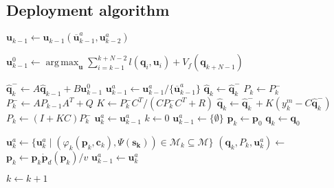\documentclass[letterpaper,10pt,conference]{ieeeconf}
\DeclarePairedDelimiter\abs{\lvert}{\rvert}%
\theoremstyle{definition}
\DeclareMathOperator*{\argmax}{arg\,max}
\begin{document}
\subsection{Deployment algorithm}

\begin{algorithmic}[1]
  \label{alg:step}
  
  \State $\mathbf{u}_{k-1}\gets {\mathbf{u}_{k-1}(\overline{\mathbf{u}}_{k-1}^a,\mathbf{u}_{k-2}^a)}$\label{alg:max_cont_sequence}

  \State $\mathbf{u}^0_{k-1}\gets\argmax_{\mathbf{u}}{\sum_{i=k-1}^{k+N-2}{l(\mathbf{q}_i,\mathbf{u}_i)+V_f(\mathbf{q}_{k+N-1})}}$\label{alg:mpc}

  \State $\hat{\mathbf{q}}_k^-\gets A\hat{\mathbf{q}}_{k-1} + B\mathbf{u}^0_{k-1}$
  \label{alg:output_constraints}
    \State $\mathbf{u}^a_{k-1}\gets\mathbf{u}^a_{k-1}/\{\overline{\mathbf{u}}^a_{k-1}\}$
    \State{}\label{alg:recursion}
  \Else
      \State $\hat{\mathbf{q}}_k\gets\hat{\mathbf{q}}_k^-$\label{alg:evolution}
      \State $P_k\gets P_k^-$
    \Else 
      \State $P_k^-\gets AP_{k-1}A^T+Q$\label{alg:kalman_start}
      \State $K\gets P_k^-C^T/(CP_k^-C^T+R)$
      \State $\hat{\mathbf{q}}_k\gets \hat{\mathbf{q}}_k^-+K(y_k^m-C\hat{\mathbf{q}}_k^-)$
      \State $P_k\gets(I+KC)P_k^-$\label{alg:kalman_end}
    \EndIf
    \State $\mathbf{u}_{k}^a\gets \mathbf{u}_{k-1}^a$
    \State{}
  \EndIf
  \EndProcedure
\vspace*{1ex}
  \State $k\gets 0$
  \State $\mathbf{u}_{k-1}^a\gets\{\emptyset\}$
  \State $\mathbf{p}_k\gets\mathbf{p}_0$
  \State $\mathbf{q}_k\gets\mathbf{q}_0$
    
    \State $\mathbf{u}_{k}^a\gets \{\mathbf{u}_{k}^a\mid(\varphi_k(\mathbf{p}_{k},\mathbf{c}_{k}),\Psi(\mathbf{s_{k}}))\in\mathcal{M}_{k}\subseteq\mathcal{M}\}$
    \State $(\mathbf{q}_k,P_k,\mathbf{u}_k^a)\gets$\label{alg:en}
    \State $\mathbf{p}_{k}\gets\mathbf{p}_k\dot{\mathbf{p}}_d(\mathbf{p}_k)/v$\label{alg:pos}
    \State $\mathbf{u}_{k-1}^a\gets\mathbf{u}_{k}^a$

    \State $k\gets k + 1$
  \EndWhile 
  \EndProcedure
\end{algorithmic}
\end{document}
